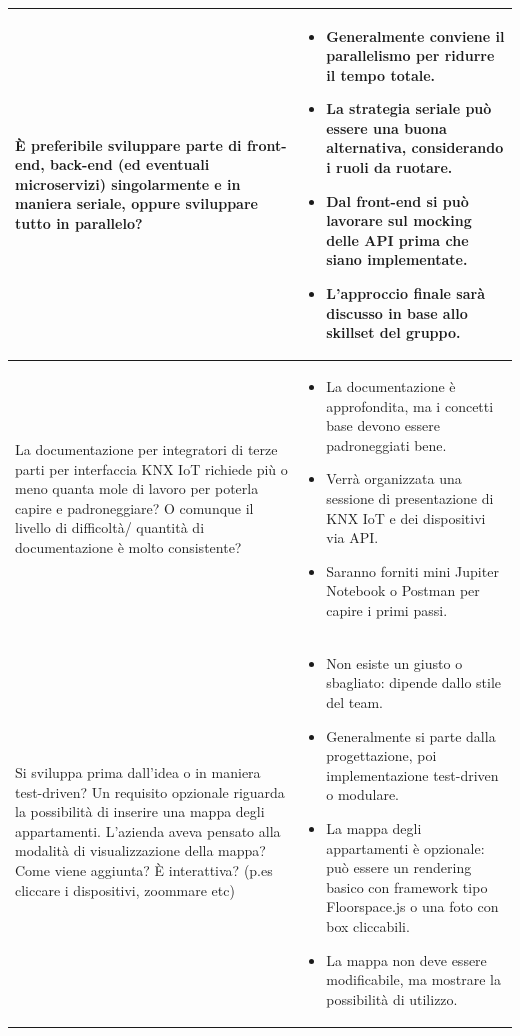\documentclass[a4paper,11pt]{article}
\begin{document}
{\begin{tabularx}{\textwidth}{|>{\raggedright\arraybackslash}X|>{\raggedright\arraybackslash}X|}
\hline
È preferibile sviluppare parte di front-end, back-end (ed eventuali microservizi) singolarmente e in maniera seriale, oppure sviluppare tutto in parallelo?
&
\begin{itemize}
\item Generalmente conviene il parallelismo per ridurre il tempo totale.
\item La strategia seriale può essere una buona alternativa, considerando i ruoli da ruotare.
\item Dal front-end si può lavorare sul mocking delle API prima che siano implementate.
\item L’approccio finale sarà discusso in base allo skillset del gruppo.
\end{itemize} \\
\hline
La documentazione per integratori di terze parti per interfaccia KNX IoT richiede più o meno quanta mole di lavoro per poterla capire e padroneggiare? O comunque il livello di difficoltà/ quantità di documentazione è molto consistente?
&
\begin{itemize}
\item La documentazione è approfondita, ma i concetti base devono essere padroneggiati bene.
\item Verrà organizzata una sessione di presentazione di KNX IoT e dei dispositivi via API.
\item Saranno forniti mini Jupiter Notebook o Postman per capire i primi passi.
\end{itemize} \\
\hline
Si sviluppa prima dall’idea o in maniera test-driven? Un requisito opzionale riguarda la possibilità di inserire una mappa degli appartamenti. L’azienda aveva pensato alla modalità di visualizzazione della mappa? Come viene aggiunta? È interattiva? (p.es cliccare i dispositivi, zoommare etc)
&
\begin{itemize}
\item Non esiste un giusto o sbagliato: dipende dallo stile del team.
\item Generalmente si parte dalla progettazione, poi implementazione test-driven o modulare.
\item La mappa degli appartamenti è opzionale: può essere un rendering basico con framework tipo Floorspace.js o una foto con box cliccabili.
\item La mappa non deve essere modificabile, ma mostrare la possibilità di utilizzo.
\end{itemize} \\
\hline
\end{tabularx}
}
\end{document}
